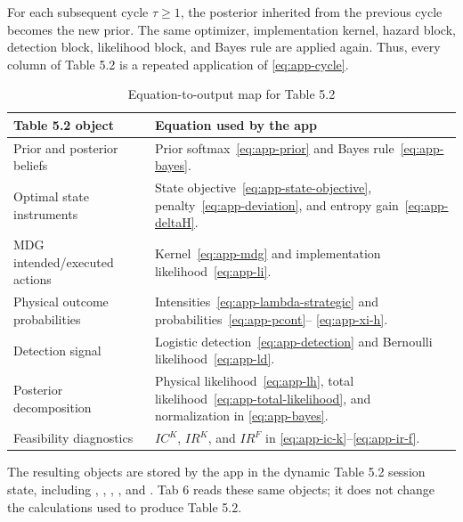 \documentclass[ecta,nameyear,final,supplement]{econsocart}
\numberwithin{equation}{section}
\begin{document}
For each subsequent cycle $\tau\ge1$, the posterior inherited from the previous
cycle becomes the new prior. The same optimizer, implementation kernel,
hazard block, detection block, likelihood block, and Bayes rule are applied
again. Thus, every column of Table 5.2 is a repeated application of
\eqref{eq:app-cycle}.

\begin{table}[t]
\centering
\caption{Equation-to-output map for Table 5.2}
\begin{tabularx}{\textwidth}{>{\raggedright\arraybackslash}p{}X}
\toprule
Table 5.2 object & Equation used by the app \\
\midrule
Prior and posterior beliefs & Prior softmax~\eqref{eq:app-prior} and Bayes
rule~\eqref{eq:app-bayes}. \\
Optimal state instruments & State objective~\eqref{eq:app-state-objective},
penalty~\eqref{eq:app-deviation}, and entropy gain~\eqref{eq:app-deltaH}. \\
MDG intended/executed actions & Kernel~\eqref{eq:app-mdg} and implementation
likelihood~\eqref{eq:app-li}. \\
Physical outcome probabilities & Intensities~\eqref{eq:app-lambda-strategic}
and probabilities~\eqref{eq:app-pcont}--
\eqref{eq:app-xi-h}. \\
Detection signal & Logistic detection~\eqref{eq:app-detection} and Bernoulli
likelihood~\eqref{eq:app-ld}. \\
Posterior decomposition & Physical likelihood~\eqref{eq:app-lh}, total
likelihood~\eqref{eq:app-total-likelihood}, and normalization in
\eqref{eq:app-bayes}. \\
Feasibility diagnostics & $IC^K$, $IR^K$, and $IR^F$ in
\eqref{eq:app-ic-k}--\eqref{eq:app-ir-f}. \\
\bottomrule
\end{tabularx}
\end{table}

The resulting objects are stored by the app in the dynamic Table 5.2 session
state, including , ,
, , and
. Tab 6 reads these same objects; it does not change
the calculations used to produce Table 5.2.
\end{document}
